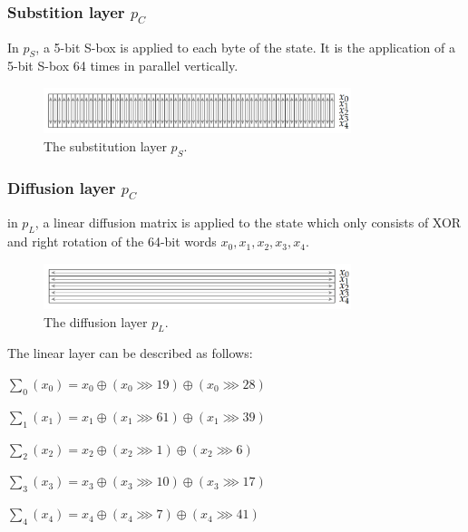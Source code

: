 \subsubsection{Substition layer $p_C$}
In $p_S$, a 5-bit S-box is applied to each byte of the state. It is the application of a 5-bit S-box 64 times in parallel vertically. \cite{ascon_specification, analysis_of_ascon}

\begin{figure}[htbp]
  \centering
  \includegraphics[width=0.8\textwidth]{images/substitution.png}
  \caption{The substitution layer $p_S$.}
  \label{fig:substition}
\end{figure}

\subsubsection{Diffusion layer $p_C$}
in $p_L$, a linear diffusion matrix is applied to the state which only consists of XOR and right rotation of the 64-bit words $x_0, x_1, x_2, x_3, x_4$. \cite{ascon_specification, analysis_of_ascon}

\begin{figure}[htbp]
  \centering
  \includegraphics[width=0.8\textwidth]{images/diffusion.png}
  \caption{The diffusion layer $p_L$. \cite{DBLP:journals/joc/DobraunigEMS21}}
  \label{fig:diffusion}
\end{figure}

The linear layer can be described as follows:


$\sum_0 (x_0) = x_0 \oplus (x_0 \ggg 19) \oplus (x_0 \ggg 28)$

$\sum_1 (x_1) = x_1 \oplus (x_1 \ggg 61) \oplus (x_1 \ggg 39)$

$\sum_2 (x_2) = x_2 \oplus (x_2 \ggg 1) \oplus (x_2 \ggg 6)$

$\sum_3 (x_3) = x_3 \oplus (x_3 \ggg 10) \oplus (x_3 \ggg 17)$

$\sum_4 (x_4) = x_4 \oplus (x_4 \ggg 7) \oplus (x_4 \ggg 41)$ 

\cite{ascon_specification,analysis_of_ascon}


